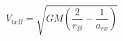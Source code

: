 \begin{equation*}
V_{txB} = \sqrt{GM \left(\frac{2}{r_{B}} - \frac{1}{a_{rx}} \right)} \tag{4.62}
\end{equation*}
